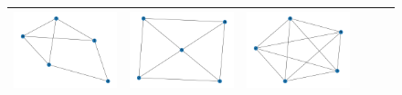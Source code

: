 \documentclass[11pt,a4paper,openright,oneside]{book}
\numberwithin{equation}{section}
\begin{document}
{\begin{figure}[h]
\begin{adjustwidth}{-3cm}{-3cm}
\begin{tabular}{>{\centering\arraybackslash}m{1.5cm} m{2.5cm} m{2.5cm} m{2.5cm} m{2.5cm} m{2.5cm}}
        \rule{0pt}{0.01cm} \includegraphics[width=\linewidth]{media/tnale/graph-3.png} \rule{0pt}{0.01cm} & 
        \rule{0pt}{0.01cm} \includegraphics[width=\linewidth]{media/tnale/graph-4.png} \rule{0pt}{0.01cm} &
        \rule{0pt}{0.01cm} \includegraphics[width=\linewidth]{media/tnale/graph-5.png} \rule{0pt}{0.01cm} \\ \hline

\end{tabular}
\end{adjustwidth}
\end{figure}}
\end{document}
